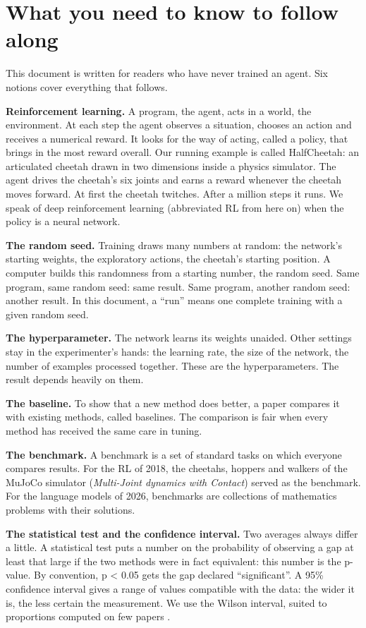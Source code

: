 \documentclass[11pt,a4paper]{article}
\begin{document}
\section{What you need to know to follow
along}\label{what-you-need-to-know-to-follow-along}

This document is written for readers who have never trained an agent.
Six notions cover everything that follows.

\textbf{Reinforcement learning.} A program, the agent, acts in a world,
the environment. At each step the agent observes a situation, chooses an
action and receives a numerical reward. It looks for the way of acting,
called a policy, that brings in the most reward overall. Our running
example is called HalfCheetah: an articulated cheetah drawn in two
dimensions inside a physics simulator. The agent drives the cheetah's
six joints and earns a reward whenever the cheetah moves forward. At
first the cheetah twitches. After a million steps it runs. We speak of
deep reinforcement learning (abbreviated RL from here on) when the
policy is a neural network.

\textbf{The random seed.} Training draws many numbers at random: the
network's starting weights, the exploratory actions, the cheetah's
starting position. A computer builds this randomness from a starting
number, the random seed. Same program, same random seed: same result.
Same program, another random seed: another result. In this document, a
``run'' means one complete training with a given random seed.

\textbf{The hyperparameter.} The network learns its weights unaided.
Other settings stay in the experimenter's hands: the learning rate, the
size of the network, the number of examples processed together. These
are the hyperparameters. The result depends heavily on them.

\textbf{The baseline.} To show that a new method does better, a paper
compares it with existing methods, called baselines. The comparison is
fair when every method has received the same care in tuning.

\textbf{The benchmark.} A benchmark is a set of standard tasks on which
everyone compares results. For the RL of 2018, the cheetahs, hoppers and
walkers of the MuJoCo simulator (\emph{Multi-Joint dynamics with
Contact}) \autocite{todorov2012mujoco} served as the benchmark. For the
language models of 2026, benchmarks are collections of mathematics
problems with their solutions.

\textbf{The statistical test and the confidence interval.} Two averages
always differ a little. A statistical test puts a number on the
probability of observing a gap at least that large if the two methods
were in fact equivalent: this number is the p-value. By convention, p
\textless{} 0.05 gets the gap declared ``significant''. A 95\%
confidence interval gives a range of values compatible with the data:
the wider it is, the less certain the measurement. We use the Wilson
interval, suited to proportions computed on few papers
\autocite{wilson1927probable}.
\end{document}
